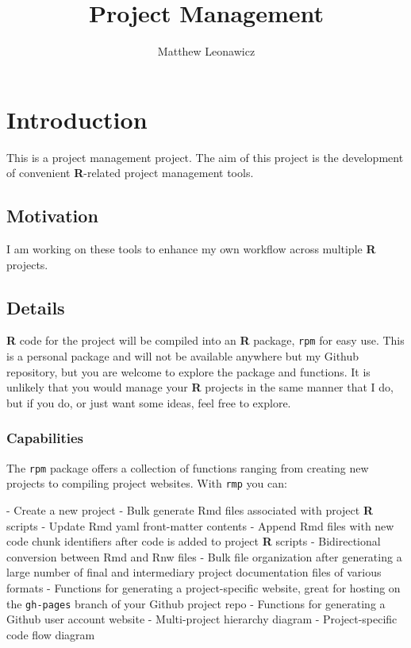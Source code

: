 \documentclass{article}\usepackage[]{graphicx}\usepackage[]{color}
\begin{document}
\title{Project Management}
\author{Matthew Leonawicz}
\maketitle



\section{Introduction}
This is a project management project.
The aim of this project is the development of convenient \textbf{R}-related project management tools.

\subsection{Motivation}
I am working on these tools to enhance my own workflow across multiple \textbf{R} projects.

\subsection{Details}
\textbf{R} code for the project will be compiled into an \textbf{R} package, \texttt{rpm} for easy use.
This is a personal package and will not be available anywhere but my Github repository,
but you are welcome to explore the package and functions.
It is unlikely that you would manage your \textbf{R} projects in the same manner that I do,
but if you do, or just want some ideas, feel free to explore.

\subsubsection{Capabilities}
The \texttt{rpm} package offers a collection of functions ranging from creating new projects to compiling project websites.
With \texttt{rmp} you can:

- Create a new project
- Bulk generate Rmd files associated with project \textbf{R} scripts
- Update Rmd yaml front-matter contents
- Append Rmd files with new code chunk identifiers after code is added to project \textbf{R} scripts
- Bidirectional conversion between Rmd and Rnw files
- Bulk file organization after generating a large number of final and intermediary project documentation files of various formats
- Functions for generating a project-specific website, great for hosting on the \texttt{gh-pages} branch of your Github project repo
- Functions for generating a Github user account website
- Multi-project hierarchy diagram
- Project-specific code flow diagram
\end{document}

